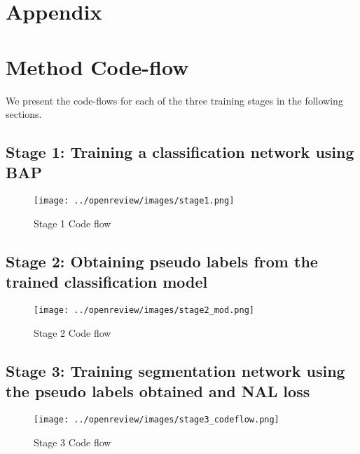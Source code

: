 \newpage
\section*{Appendix}
\section{Method Code-flow}
We present the code-flows for each of the three training stages in the following sections. 
\subsection{Stage 1: Training a classification network using BAP}
\vspace{5mm}
\begin{figure}[ht!]
\centering
\begin{center}
\texttt{[image: ../openreview/images/stage1.png]}
\caption{\label{fig:bap1}{Stage 1 Code flow}}
\end{center}
\end{figure}

\newpage
\subsection{Stage 2: Obtaining pseudo labels from the trained classification model}
\begin{figure}[ht!]
\centering
\vspace{20mm}
\begin{center}
\texttt{[image: ../openreview/images/stage2\_mod.png]}
\caption{\label{fig:bap2}{Stage 2 Code flow}}
\end{center}
\end{figure}

\newpage
\subsection{Stage 3: Training segmentation network using the pseudo labels obtained and NAL loss}
\begin{figure}[ht!]
\vspace{20mm}
\centering
\texttt{[image: ../openreview/images/stage3\_codeflow.png]}
\caption{\label{fig:bap3}{Stage 3 Code flow}}
\end{figure}

\newpage
